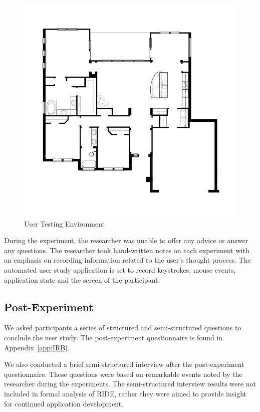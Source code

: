 \begin{figure}[ht]
\begin{center}
\includegraphics[width=5in]{images/generic-house.png}
\caption{User Testing Environment\label{fig:test-environment}}
\end{center}
\end{figure}

During the experiment, the researcher was unable to offer any advice or answer any questions. The researcher took hand-written notes on each experiment with an emphasis on recording information related to the user’s thought process. The automated user study application is set to record keystrokes, mouse events, application state and the screen of the participant.


\subsection{Post-Experiment} %
\label{sub:post_experiment}
We asked participants a series of structured and semi-structured questions to conclude the user study. The post-experiment questionnaire is found in Appendix~\ref{app:IRB}.

We also conducted a brief semi-structured interview after the post-experiment questionnaire. These questions were based on remarkable events noted by the researcher during the experiments. The semi-structured interview results were not included in formal analysis of RIDE, rather they were aimed to provide insight for continued application development.
